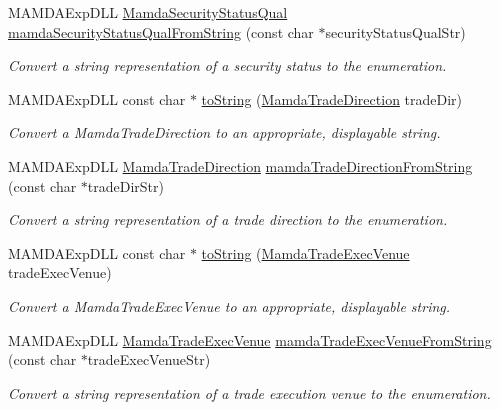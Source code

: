 \begin{CompactItemize}
MAMDAExp\-DLL \hyperlink{namespaceWombat_2de6f22c731ba94169dc24b8054862b8}{Mamda\-Security\-Status\-Qual} \hyperlink{namespaceWombat_b257fbe7b1db6cbf114cdd340240d661}{mamda\-Security\-Status\-Qual\-From\-String} (const char $\ast$security\-Status\-Qual\-Str)
\begin{CompactList}\small\item\em Convert a string representation of a security status to the enumeration. \item\end{CompactList}\item 
MAMDAExp\-DLL const char $\ast$ \hyperlink{namespaceWombat_dea7c5c2ec47f5a63fbcacf27600e898}{to\-String} (\hyperlink{namespaceWombat_d2479765bb418204c8ccfd3785d2bdbe}{Mamda\-Trade\-Direction} trade\-Dir)
\begin{CompactList}\small\item\em Convert a Mamda\-Trade\-Direction to an appropriate, displayable string. \item\end{CompactList}\item 
MAMDAExp\-DLL \hyperlink{namespaceWombat_d2479765bb418204c8ccfd3785d2bdbe}{Mamda\-Trade\-Direction} \hyperlink{namespaceWombat_b52f29f94fe338b790a8adb9ef1bca3d}{mamda\-Trade\-Direction\-From\-String} (const char $\ast$trade\-Dir\-Str)
\begin{CompactList}\small\item\em Convert a string representation of a trade direction to the enumeration. \item\end{CompactList}\item 
MAMDAExp\-DLL const char $\ast$ \hyperlink{namespaceWombat_2cdfa338b0576698d5e838cee79d1a2d}{to\-String} (\hyperlink{namespaceWombat_daf4c098665070a9e45bf835bad3548a}{Mamda\-Trade\-Exec\-Venue} trade\-Exec\-Venue)
\begin{CompactList}\small\item\em Convert a Mamda\-Trade\-Exec\-Venue to an appropriate, displayable string. \item\end{CompactList}\item 
MAMDAExp\-DLL \hyperlink{namespaceWombat_daf4c098665070a9e45bf835bad3548a}{Mamda\-Trade\-Exec\-Venue} \hyperlink{namespaceWombat_7e9c4d36706b3a14991d10fe239d4e18}{mamda\-Trade\-Exec\-Venue\-From\-String} (const char $\ast$trade\-Exec\-Venue\-Str)
\begin{CompactList}\small\item\em Convert a string representation of a trade execution venue to the enumeration. \item\end{CompactList}\item 

\end{CompactItemize}
